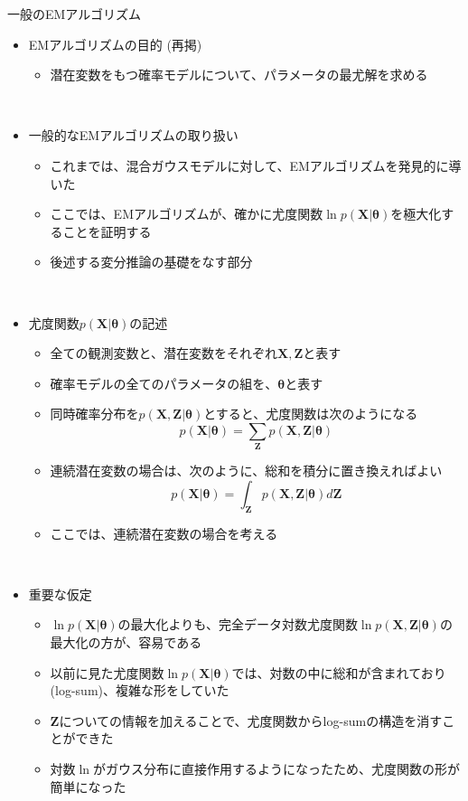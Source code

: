 \documentclass[dvipdfmx,notheorems,t]{beamer}
\begin{document}
\begin{frame}{一般のEMアルゴリズム}

\begin{itemize}
	\item EMアルゴリズムの目的 (再掲)
	\begin{itemize}
		\item 潜在変数をもつ確率モデルについて、パラメータの最尤解を求める
	\end{itemize} \
	
	\item 一般的なEMアルゴリズムの取り扱い
	\begin{itemize}
		\item これまでは、混合ガウスモデルに対して、EMアルゴリズムを発見的に導いた
		\item ここでは、EMアルゴリズムが、確かに尤度関数$\ln p(\bm{X} | \bm{\theta})$を\alert{極大化}することを証明する
		\item 後述する\alert{変分推論}の基礎をなす部分
	\end{itemize} \
	
	\item 尤度関数$p(\bm{X} | \bm{\theta})$の記述
	\begin{itemize}
		\item 全ての観測変数と、潜在変数をそれぞれ$\bm{X}, \bm{Z}$と表す
		\item 確率モデルの全てのパラメータの組を、$\bm{\theta}$と表す
		\item 同時確率分布を$p(\bm{X}, \bm{Z} | \bm{\theta})$とすると、尤度関数は次のようになる
		\begin{equation}
			p(\bm{X} | \bm{\theta}) = \sum_{\bm{Z}} p(\bm{X}, \bm{Z} | \bm{\theta})
		\end{equation}
		
		\item 連続潜在変数の場合は、次のように、総和を積分に置き換えればよい
		\begin{equation}
			p(\bm{X} | \bm{\theta}) = \int_{\bm{Z}} p(\bm{X}, \bm{Z} | \bm{\theta}) d\bm{Z}
		\end{equation}
		
		\item ここでは、連続潜在変数の場合を考える
	\end{itemize} \
	
	\item \alert{重要な仮定}
	\begin{itemize}
		\item $\ln p(\bm{X} | \bm{\theta})$の最大化よりも、完全データ対数尤度関数$\ln p(\bm{X}, \bm{Z} | \bm{\theta})$の最大化の方が、容易である
		\newline
		\item 以前に見た尤度関数$\ln p(\bm{X} | \bm{\theta})$では、対数の中に総和が含まれており(\alert{log-sum})、複雑な形をしていた
		\item $\bm{Z}$についての情報を加えることで、尤度関数からlog-sumの構造を消すことができた
		\item 対数$\ln$がガウス分布に直接作用するようになったため、尤度関数の形が簡単になった
	\end{itemize} \
	

\end{itemize}
\end{frame}
\end{document}
